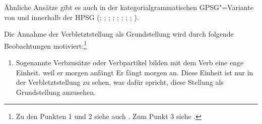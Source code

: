 Ähnliche Ansätze gibt es auch in der kategorialgrammatischen GPSG"=Variante von \citet[]{Jacobs86a}
und innerhalb der HPSG (\citealp*{KW91a}; \citealp{Oliva92a}; \citealp*{Netter92};
\citealp*{Kiss93}; \citealp*{Frank94}; \citealp*{Kiss95a}; \citealp{Feldhaus97};
\citealp{Meurers2000b}; \citealp{Mueller2005c}).

Die Annahme der Verbletztstellung\label{page-verbletzt} als Grundstellung wird durch folgende Beobachtungen
motiviert:\footnote{
  Zu den Punkten 1 und 2 siehe auch . Zum Punkt
  3 siehe .%
}
\begin{enumerate}
\item Sogenannte Verbzusätze oder Verbpartikel bilden mit dem Verb eine enge Einheit.
\eal
\ex weil er morgen anfängt
\ex Er fängt morgen an.
\zl
Diese Einheit ist nur in der Verbletztstellung zu sehen, was dafür spricht, diese
Stellung als Grundstellung anzusehen. 


\end{enumerate}
